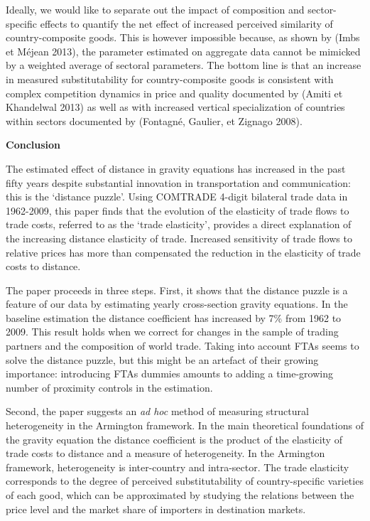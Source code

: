 \documentclass[12pt,twoside,a4paper,notitlepage]{article}
\begin{document}
Ideally, we would like to separate out the impact of composition and sector-specific effects to quantify the net effect of increased perceived similarity of country-composite goods. This is however impossible because, as shown by (Imbs et M\'{e}jean 2013), the parameter estimated on aggregate data cannot be mimicked by a weighted average of sectoral parameters. The bottom line is that an increase in measured substitutability for country-composite goods is consistent with complex competition dynamics in price and quality documented by (Amiti et Khandelwal 2013) as well as with increased vertical specialization of countries within sectors documented by (Fontagn\'{e}, Gaulier, et Zignago 2008).

\textbf{Conclusion}

The estimated effect of distance in gravity equations has increased in the past fifty years despite substantial innovation in transportation and communication: this is the `distance puzzle'. Using COMTRADE 4-digit bilateral trade data in 1962-2009, this paper finds that the evolution of the elasticity of trade flows to trade costs, referred to as the `trade elasticity', provides a direct explanation of the increasing distance elasticity of trade. Increased sensitivity of trade flows to relative prices has more than compensated the reduction in the elasticity of trade costs to distance.

The paper proceeds in three steps. First, it shows that the distance puzzle is a feature of our data by estimating yearly cross-section gravity equations. In the baseline estimation the distance coefficient has increased by 7\% from 1962 to 2009. This result holds when we correct for changes in the sample of trading partners and the composition of world trade. Taking into account FTAs seems to solve the distance puzzle, but this might be an artefact of their growing importance: introducing FTAs dummies amounts to adding a time-growing number of proximity controls in the estimation.

Second, the paper suggests an \textit{ad hoc} method of measuring structural heterogeneity in the Armington framework. In the main theoretical foundations of the gravity equation the distance coefficient is the product of the elasticity of trade costs to distance and a measure of heterogeneity. In the Armington framework, heterogeneity is inter-country and intra-sector. The trade elasticity corresponds to the degree of perceived substitutability of country-specific varieties of each good, which can be approximated by studying the relations between the price level and the market share of importers in destination markets.
\end{document}
